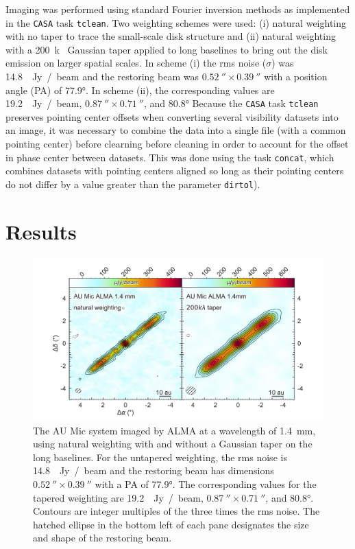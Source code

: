 \documentclass[12pt,oneside]{article}
\begin{document}
Imaging was performed using standard Fourier inversion methods as implemented in the \texttt{CASA} task \texttt{tclean}. 
Two weighting schemes were used: (i) natural weighting with no taper to trace the small-scale disk structure and (ii) natural weighting with a \SI{200}{k\lambda} Gaussian taper applied to long baselines to bring out the disk emission on larger spatial scales. 
In scheme (i) the rms noise ($\sigma$) was \SI{14.8}{\mu Jy / beam} and the restoring beam was $\SI{0.52}{''} \times \SI{0.39}{''}$ with a position angle (PA) of \ang{77.9}. 
In scheme (ii), the corresponding values are \SI{19.2}{\mu Jy / beam}, $\SI{0.87}{''} \times \SI{0.71}{''}$, and \ang{80.8}
Because the \texttt{CASA} task \texttt{tclean} preserves pointing center offsets when converting several visibility datasets into an image, it was necessary to combine the data into a single file (with a common pointing center) before clearning before cleaning in order to account for the offset in phase center between datasets. 
This was done using the task \texttt{concat}, which combines datasets with pointing centers aligned so long as their pointing centers do not differ by a value greater than the parameter \texttt{dirtol}).


\section{Results}
\label{section: results}

\begin{figure}
  \includegraphics[width=\linewidth]{figures/aumic_imaged}
  \caption{The AU Mic system imaged by ALMA at a wavelength of \SI{1.4}{mm}, using natural weighting with and without a Gaussian taper on the long baselines. 
  For the untapered weighting, the rms noise is \SI{14.8}{\mu Jy / beam} and the restoring beam has dimensions $\SI{0.52}{''} \times \SI{0.39}{''}$ with a PA of \ang{77.9}.
  The corresponding values for the tapered weighting are \SI{19.2}{\mu Jy / beam}, $\SI{0.87}{''} \times \SI{0.71}{''}$, and \ang{80.8}. 
  Contours are integer multiples of the three times the rms noise.
  The hatched ellipse in the bottom left of each pane designates the size and shape of the restoring beam.
  }
  \label{fig: aumic_imaged}
\end{figure}
\end{document}
